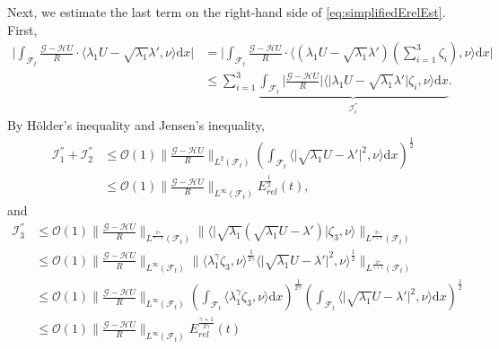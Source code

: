 \documentclass[11pt,twoside,reqno]{amsart}
\numberwithin{equation}{section}
\numberwithin{figure}{section}
\newcommand{\qnt}[1]{\left(#1\right)}
\begin{document}
Next, we estimate the last term on the right-hand side of \eqref{eq:simplifiedErelEst}. First,
\begin{equation}\label{eq:Finalstep2}
   \begin{aligned}
       \big|\int_{\mathcal{F}_t} \frac{\mathcal{G}-\mathcal{H} U}{R}\cdot\langle\lambda_1U-\sqrt{\lambda_1}\lambda',\nu\rangle\mathrm{d}x\big|
       &=\big|\int_{\mathcal{F}_t} \frac{\mathcal{G}-\mathcal{H} U}{R}\cdot\langle(\lambda_1U-\sqrt{\lambda_1}\lambda')(\sum_{i=1}^3\zeta_i),\nu\rangle\mathrm{d}x\big|\\
       &\leq\sum_{i=1}^3\underbrace{\int_{\mathcal{F}_t}\big|\frac{\mathcal{G}-\mathcal{H} U}{R}\big|\langle\big|\lambda_1U-\sqrt{\lambda_1}\lambda'\big|\zeta_i,\nu\rangle\mathrm{d}x}_{\mathcal{I}^{''}_i}.
   \end{aligned} 
\end{equation}
By  Hölder's inequality and Jensen's inequality,
\begin{equation}\label{eq:III1}
    \begin{aligned}
        \mathcal{I}^{''}_1+\mathcal{I}^{''}_2&\leq \mathcal{O}(1)\|\frac{\mathcal{G}-\mathcal{H} U}{R}\|_{L^2(\mathcal{F}_t)}\qnt{\int_{\mathcal{F}_t}\langle\big|\sqrt{\lambda_1}U-\lambda'\big|^2,\nu\rangle\mathrm{d}x}^{\frac{1}{2}}\\&\leq \mathcal{O}(1)\|\frac{\mathcal{G}-\mathcal{H} U}{R}\|_{L^\infty(\mathcal{F}_t)}E_{rel}^{\frac{1}{2}}(t),
    \end{aligned}
\end{equation}
and 
\begin{equation}\label{eq:III2}
    \begin{aligned}
        \mathcal{I}^{''}_3&\leq \mathcal{O}(1)\|\frac{\mathcal{G}-\mathcal{H} U}{R}\|_{L^{\frac{2\gamma}{\gamma-1}}(\mathcal{F}_t)}\|\langle\big|\sqrt{\lambda_1}(\sqrt{\lambda_1}U-\lambda')\big|\zeta_3,\nu\rangle\|_{L^{\frac{2\gamma}{\gamma+1}}(\mathcal{F}_t)}\\&\leq \mathcal{O}(1)\|\frac{\mathcal{G}-\mathcal{H} U}{R}\|_{L^{\infty}(\mathcal{F}_t)}\|\langle\lambda_1^\gamma\zeta_3,\nu\rangle^{\frac{1}{2\gamma}}\langle\big|\sqrt{\lambda_1}U-\lambda'\big|^2,\nu\rangle^{\frac{1}{2}}\|_{L^{\frac{2\gamma}{\gamma+1}}(\mathcal{F}_t)}\\&\leq \mathcal{O}(1)\|\frac{\mathcal{G}-\mathcal{H} U}{R}\|_{L^{\infty}(\mathcal{F}_t)} \qnt{\int_{\mathcal{F}_t}\langle\lambda_1^\gamma\zeta_3,\nu\rangle\mathrm{d}x}^{\frac{1}{2\gamma}}\qnt{\int_{\mathcal{F}_t}\langle\big|\sqrt{\lambda_1}U-\lambda'\big|^2,\nu\rangle\mathrm{d}x}^{\frac{1}{2}}\\&\leq \mathcal{O}(1)\|\frac{\mathcal{G}-\mathcal{H} U}{R}\|_{L^{\infty}(\mathcal{F}_t)} E^{\frac{\gamma+1}{2\gamma}}_{rel}(t)
    \end{aligned}
\end{equation}
\end{document}
